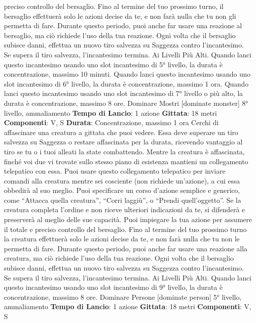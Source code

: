 \begin{multicols}{2}
preciso controllo del bersaglio. Fino al termine del tuo
prossimo turno, il bersaglio effettuerà solo le azioni
decise da te, e non farà nulla che tu non gli permetta di
fare. Durante questo periodo, puoi anche far usare una
reazione al bersaglio, ma ciò richiede l’uso della tua
reazione.
Ogni volta che il bersaglio subisce danni, effettua un
nuovo tiro salvezza su Saggezza contro l’incantesimo.
Se supera il tiro salvezza, l’incantesimo termina.
Ai Livelli Più Alti. Quando lanci questo incantesimo
usando uno slot incantesimo di 5° livello, la durata è
concentrazione, massimo 10 minuti. Quando lanci
questo incantesimo usando uno slot incantesimo di 6°
livello, la durata è concentrazione, massimo 1 ora.
Quando lanci questo incantesimo usando uno slot
incantesimo di 7° livello o più alto, la durata è
concentrazione, massimo 8 ore.
Dominare Mostri
[dominate monster]
8° livello, ammaliamento
\textbf{Tempo di Lancio}: 1 azione
\textbf{Gittata}: 18 metri
\textbf{Componenti}: V, S
\textbf{Durata}: Concentrazione, massimo 1 ora
Cerchi di affascinare una creatura a gittata che puoi
vedere. Essa deve superare un tiro salvezza su
Saggezza o restare affascinata per la durata, ricevendo
vantaggio al tiro se tu o i tuoi alleati la state
combattendo.
Mentre la creatura è affascinata, finché voi due vi
trovate sullo stesso piano di esistenza mantieni un
collegamento telepatico con essa. Puoi usare questo
collegamento telepatico per inviare comandi alla
creatura mentre sei cosciente (non richiede un’azione),
a cui essa obbedirà al suo meglio. Puoi specificare un
corso d’azione semplice e generico, come “Attacca
quella creatura”, “Corri laggiù”, o “Prendi quell’oggetto”.
Se la creatura completa l’ordine e non riceve ulteriori
indicazioni da te, si difenderà e preserverà al meglio
delle sue capacità.
Puoi impiegare la tua azione per assumere il totale e
preciso controllo del bersaglio. Fino al termine del tuo
prossimo turno la creatura effettuerà solo le azioni
decise da te, e non farà nulla che tu non le permetta di
fare. Durante questo periodo, puoi anche far usare una
reazione alla creatura, ma ciò richiede l’uso della tua
reazione.
Ogni volta che il bersaglio subisce danni, effettua un
nuovo tiro salvezza su Saggezza contro l’incantesimo.
Se supera il tiro salvezza, l’incantesimo termina.
Ai Livelli Più Alti. Quando lanci questo incantesimo
usando uno slot incantesimo di 9° livello, la durata è
concentrazione, massimo 8 ore.
Dominare Persone
[dominate person]
5° livello, ammaliamento
\textbf{Tempo di Lancio}: 1 azione
\textbf{Gittata}: 18 metri
\textbf{Componenti}: V, S

\end{multicols}
